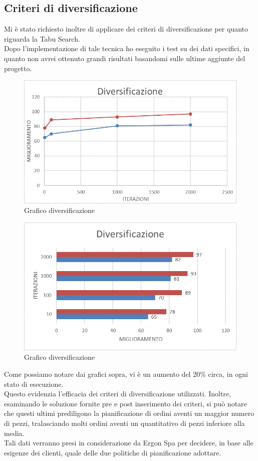 \newpage
\subsection{Criteri di diversificazione}

Mi è stato richiesto inoltre di applicare dei criteri di diversificazione per quanto riguarda la Tabu Search.\\ Dopo l'implementazione di tale tecnica ho eseguito i test su dei
dati specifici, in quanto non avrei ottenuto grandi risultati basandomi sulle ultime aggiunte del progetto.

\begin{figure}[H]
	\includegraphics[width=13cm]{immagini/diversificazione.png}
	\centering
	\caption{Grafico diversificazione}
\end{figure}

\begin{figure}[H]
	\includegraphics[width=13cm]{immagini/diversificazione2.png}
	\centering
	\caption{Grafico diversificazione}
\end{figure}

Come possiamo notare dai grafici sopra, vi è un aumento del 20\% circa, in ogni stato di esecuzione.\\ Questo evidenzia l'efficacia dei criteri di diversificazione utilizzati.
Inoltre, esaminando le soluzione fornite pre e post inserimento dei criteri, si può notare che questi ultimi prediligono la pianificazione di ordini aventi un maggior numero
di pezzi, tralasciando molti ordini aventi un quantitativo di pezzi inferiore alla media. \\Tali dati verranno presi in considerazione da Ergon Spa per decidere, in base
alle esigenze dei clienti, quale delle due politiche di pianificazione adottare.
